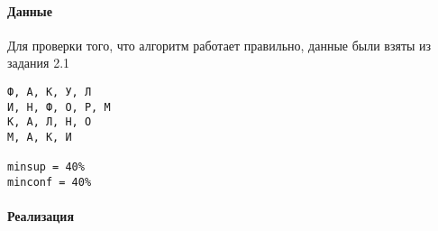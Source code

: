 \documentclass[
]{article}
\begin{document}
\hypertarget{ux434ux430ux43dux43dux44bux435-1}{%
\paragraph{Данные}\label{ux434ux430ux43dux43dux44bux435-1}}

Для проверки того, что алгоритм работает правильно, данные были взяты из
задания 2.1

\begin{verbatim}
Ф, А, К, У, Л
И, Н, Ф, О, Р, М
К, А, Л, Н, О
М, А, К, И

minsup = 40% 
minconf = 40%
\end{verbatim}

\hypertarget{ux440ux435ux430ux43bux438ux437ux430ux446ux438ux44f-1}{%
\paragraph{Реализация}\label{ux440ux435ux430ux43bux438ux437ux430ux446ux438ux44f-1}}
\end{document}
